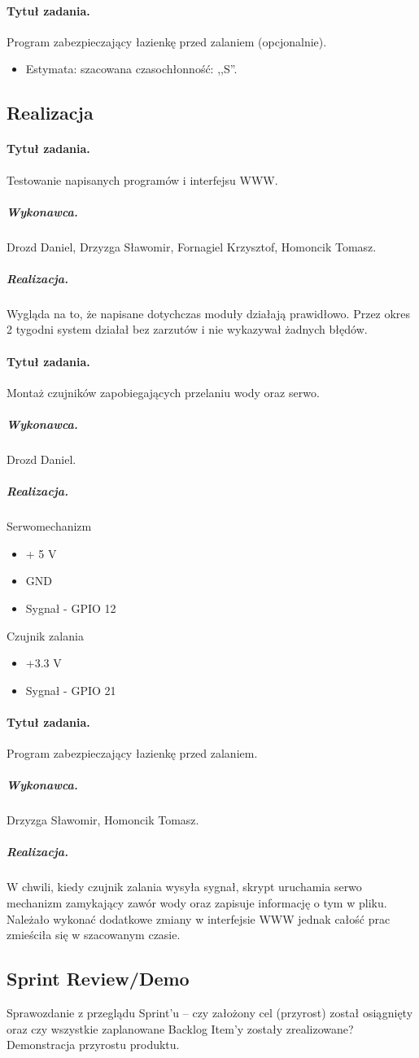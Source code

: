 \paragraph{Tytuł zadania.} Program zabezpieczający łazienkę przed zalaniem (opcjonalnie).
\begin{itemize}
	\item Estymata: szacowana czasochłonność: ,,S''.
\end{itemize}


\subsection{Realizacja}

\paragraph{Tytuł zadania.} Testowanie napisanych programów i interfejsu WWW.
\subparagraph{Wykonawca.} Drozd Daniel, Drzyzga Sławomir, Fornagiel Krzysztof, Homoncik Tomasz.
\subparagraph{Realizacja.}
Wygląda na to, że napisane dotychczas moduły działają prawidłowo. Przez okres 2 tygodni system działał bez zarzutów i nie wykazywał żadnych błędów.

\paragraph{Tytuł zadania.} Montaż czujników zapobiegających przelaniu wody oraz serwo.
\subparagraph{Wykonawca.} Drozd Daniel.
\subparagraph{Realizacja.} 
Serwomechanizm

\begin{itemize}
	\item + 5 V
	\item GND
	\item Sygnał - GPIO 12
\end{itemize}
Czujnik zalania
\begin{itemize}
	\item +3.3 V
	\item Sygnał - GPIO 21
\end{itemize}

\paragraph{Tytuł zadania.} Program zabezpieczający łazienkę przed zalaniem.
\subparagraph{Wykonawca.} Drzyzga Sławomir, Homoncik Tomasz.
\subparagraph{Realizacja.} 
W chwili, kiedy czujnik zalania wysyła sygnał, skrypt uruchamia serwo mechanizm zamykający zawór wody oraz zapisuje informację o tym w pliku. Należało wykonać dodatkowe zmiany w interfejsie WWW jednak całość prac zmieściła się w szacowanym czasie.



\subsection{Sprint Review/Demo}
Sprawozdanie z przeglądu Sprint'u -- czy założony cel (przyrost) został osiągnięty oraz czy wszystkie zaplanowane Backlog Item'y zostały zrealizowane? Demonstracja przyrostu produktu.
